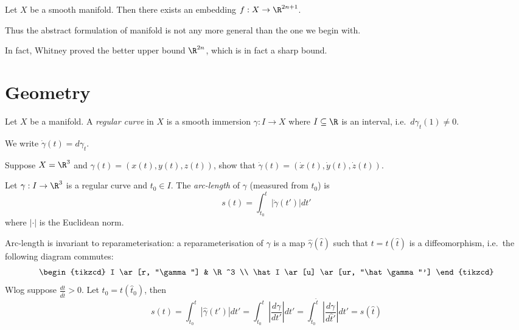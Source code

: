 \documentclass[a4paper]{article}
\begin{document}
\begin{theorem}
  Let \(X\) be a smooth manifold. Then there exists an embedding \(f: X \to \R^{2n + 1}\).
\end{theorem}

Thus the abstract formulation of manifold is not any more general than the one we begin with.

In fact, Whitney proved the better upper bound \(\R^{2n}\), which is in fact a sharp bound.

\section{Geometry}

\begin{definition}
  Let \(X\) be a manifold. A \emph{regular curve} in \(X\) is a smooth immersion \(\gamma: I \to X\) where \(I \subseteq \R\) is an interval, i.e.\ \(d\gamma_t(1) \neq 0\).
\end{definition}

\begin{notation}
  We write \(\dot \gamma(t) = d\gamma_t\).
\end{notation}

\begin{ex}
  Suppose \(X = \R^3\) and \(\gamma(t) = (x(t), y(t), z(t))\), show that \(\dot \gamma(t) = (\dot x(t), \dot y(t), \dot z(t))\).
\end{ex}

\begin{definition}
  Let \(\gamma: I \to \R^3\) is a regular curve and \(t_0 \in I\). The \emph{arc-length} of \(\gamma\) (measured from \(t_0\)) is
  \[
    s(t) = \int_{t_0}^t |\dot \gamma(t')| dt'
  \]
  where \(|\cdot|\) is the Euclidean norm.
\end{definition}

Arc-length is invariant to reparameterisation: a reparameterisation of \(\gamma\) is a map \(\hat \gamma(\hat t)\) such that \(t = t(\hat t)\) is a diffeomorphism, i.e.\ the following diagram commutes:
\[
  \begin{tikzcd}
    I \ar[r, "\gamma"] & \R^3 \\
    \hat I \ar[u] \ar[ur, "\hat \gamma"']
  \end{tikzcd}
\]
Wlog suppose \(\frac{dt}{d\hat t} > 0\). Let \(t_0 = t(\hat t_0)\), then
  \[
    s(t)
    = \int_{t_0}^t |\hat \gamma(t')| dt'
    = \int_{t_0}^t \left| \frac{d\gamma}{dt'} \right| dt'
    = \int_{\hat t_0}^{\hat t} \left| \frac{d\gamma}{d\hat t'} \right| dt'
    = s(\hat t)
  \]
\end{document}
